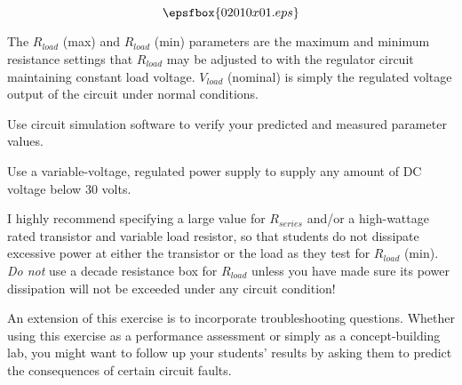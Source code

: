 

$$\epsfbox{02010x01.eps}$$

The $R_{load}$ (max) and $R_{load}$ (min) parameters are the maximum and minimum resistance settings that $R_{load}$ may be adjusted to with the regulator circuit maintaining constant load voltage.  $V_{load}$ (nominal) is simply the regulated voltage output of the circuit under normal conditions.

\vfil \eject






Use circuit simulation software to verify your predicted and measured parameter values.







Use a variable-voltage, regulated power supply to supply any amount of DC voltage below 30 volts.

I highly recommend specifying a large value for $R_{series}$ and/or a high-wattage rated transistor and variable load resistor, so that students do not dissipate excessive power at either the transistor or the load as they test for $R_{load}$ (min).  {\it Do not} use a decade resistance box for $R_{load}$ unless you have made sure its power dissipation will not be exceeded under any circuit condition!

An extension of this exercise is to incorporate troubleshooting questions.  Whether using this exercise as a performance assessment or simply as a concept-building lab, you might want to follow up your students' results by asking them to predict the consequences of certain circuit faults.




